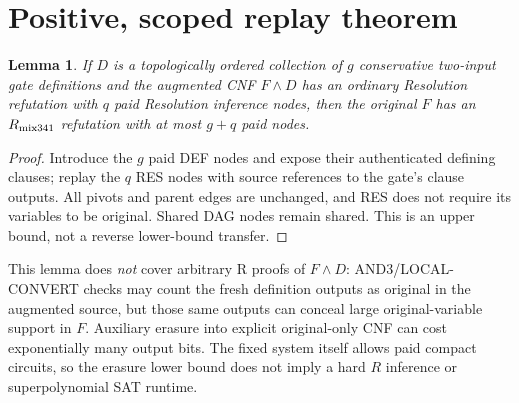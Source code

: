 \documentclass[11pt]{article}
\newtheorem{lemma}{Lemma}
\begin{document}
\section*{Positive, scoped replay theorem}
\begin{lemma}
If $D$ is a topologically ordered collection of $g$ conservative two-input gate definitions and the augmented CNF $F\wedge D$ has an ordinary Resolution refutation with $q$ paid Resolution inference nodes, then the \emph{original} $F$ has an $R_{\rm mix341}$ refutation with at most $g+q$ paid nodes.
\end{lemma}
\begin{proof}
Introduce the $g$ paid DEF nodes and expose their authenticated defining clauses; replay the $q$ RES nodes with source references to the gate's clause outputs. All pivots and parent edges are unchanged, and RES does not require its variables to be original. Shared DAG nodes remain shared. This is an upper bound, not a reverse lower-bound transfer.
\end{proof}
\noindent This lemma does \emph{not} cover arbitrary R proofs of $F\wedge D$: AND3/LOCAL-CONVERT checks may count the fresh definition outputs as original in the augmented source, but those same outputs can conceal large original-variable support in $F$. Auxiliary erasure into explicit original-only CNF can cost exponentially many output bits. The fixed system itself allows paid compact circuits, so the erasure lower bound does not imply a hard $R$ inference or superpolynomial SAT runtime.
\end{document}
